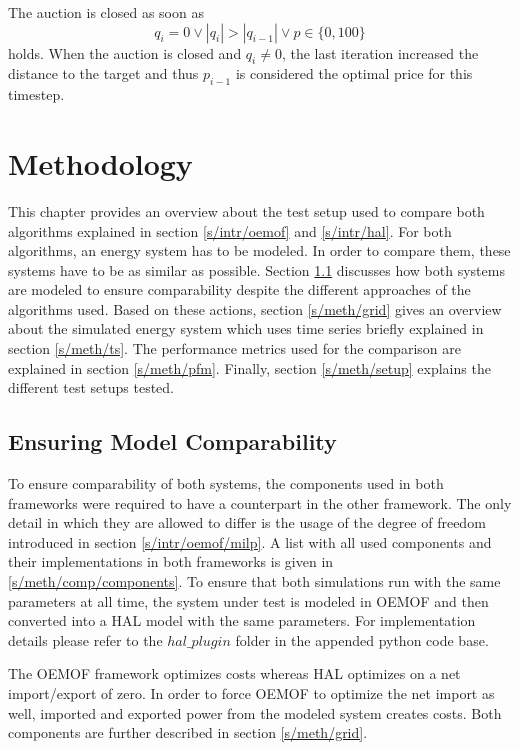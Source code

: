 \documentclass[a4paper,12pt]{book}
\theoremstyle{break}
\begin{document}
The auction is closed as soon as 
\begin{equation}\label{e/hal/closingCondition}
	q_i = 0 \lor |q_i| > |q_{i-1}| \lor p \in \{0, 100\}
\end{equation}
holds. When the auction is closed and $q_i \neq 0$, the last iteration increased the distance to the target and thus $p_{i-1}$ is considered the optimal price for this timestep.

\chapter{Methodology}\label{ch/methodology}
This chapter provides an overview about the test setup used to compare both algorithms explained in section \ref{s/intr/oemof} and \ref{s/intr/hal}.
For both algorithms, an energy system has to be modeled. In order to compare them, these systems have to be as similar as possible.
Section \ref{s/meth/comparability} discusses how both systems are modeled to ensure comparability despite the different approaches of the algorithms used.
Based on these actions, section \ref{s/meth/grid} gives an overview about the simulated energy system which uses time series briefly explained in section \ref{s/meth/ts}.
The performance metrics used for the comparison are explained in section \ref{s/meth/pfm}.
Finally, section \ref{s/meth/setup} explains the different test setups tested.

\section{Ensuring Model Comparability}\label{s/meth/comparability}
To ensure comparability of both systems, the components used in both frameworks were required to have a counterpart in the other framework.
The only detail in which they are allowed to differ is the usage of the degree of freedom introduced in section \ref{s/intr/oemof/milp}.
A list with all used components and their implementations in both frameworks is given in \ref{s/meth/comp/components}.
To ensure that both simulations run with the same parameters at all time, the system under test is modeled in \ac{OEMOF} and then converted into a HAL model with the same parameters.
For implementation details please refer to the $hal\_plugin$ folder in the appended python code base.

The \ac{OEMOF} framework optimizes costs whereas HAL optimizes on a net import/export of zero.  
In order to force \ac{OEMOF} to optimize the net import as well, imported and exported power from the modeled system creates costs. Both components are further described in section \ref{s/meth/grid}.
\end{document}
